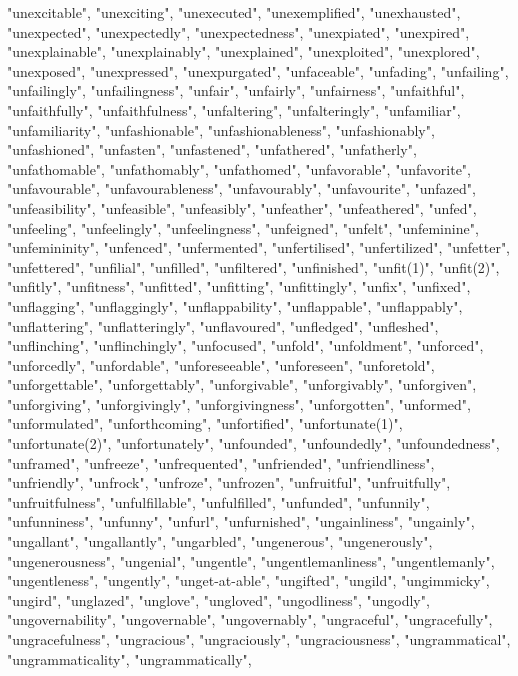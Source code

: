 "unexcitable",
"unexciting",
"unexecuted",
"unexemplified",
"unexhausted",
"unexpected",
"unexpectedly",
"unexpectedness",
"unexpiated",
"unexpired",
"unexplainable",
"unexplainably",
"unexplained",
"unexploited",
"unexplored",
"unexposed",
"unexpressed",
"unexpurgated",
"unfaceable",
"unfading",
"unfailing",
"unfailingly",
"unfailingness",
"unfair",
"unfairly",
"unfairness",
"unfaithful",
"unfaithfully",
"unfaithfulness",
"unfaltering",
"unfalteringly",
"unfamiliar",
"unfamiliarity",
"unfashionable",
"unfashionableness",
"unfashionably",
"unfashioned",
"unfasten",
"unfastened",
"unfathered",
"unfatherly",
"unfathomable",
"unfathomably",
"unfathomed",
"unfavorable",
"unfavorite",
"unfavourable",
"unfavourableness",
"unfavourably",
"unfavourite",
"unfazed",
"unfeasibility",
"unfeasible",
"unfeasibly",
"unfeather",
"unfeathered",
"unfed",
"unfeeling",
"unfeelingly",
"unfeelingness",
"unfeigned",
"unfelt",
"unfeminine",
"unfemininity",
"unfenced",
"unfermented",
"unfertilised",
"unfertilized",
"unfetter",
"unfettered",
"unfilial",
"unfilled",
"unfiltered",
"unfinished",
"unfit(1)",
"unfit(2)",
"unfitly",
"unfitness",
"unfitted",
"unfitting",
"unfittingly",
"unfix",
"unfixed",
"unflagging",
"unflaggingly",
"unflappability",
"unflappable",
"unflappably",
"unflattering",
"unflatteringly",
"unflavoured",
"unfledged",
"unfleshed",
"unflinching",
"unflinchingly",
"unfocused",
"unfold",
"unfoldment",
"unforced",
"unforcedly",
"unfordable",
"unforeseeable",
"unforeseen",
"unforetold",
"unforgettable",
"unforgettably",
"unforgivable",
"unforgivably",
"unforgiven",
"unforgiving",
"unforgivingly",
"unforgivingness",
"unforgotten",
"unformed",
"unformulated",
"unforthcoming",
"unfortified",
"unfortunate(1)",
"unfortunate(2)",
"unfortunately",
"unfounded",
"unfoundedly",
"unfoundedness",
"unframed",
"unfreeze",
"unfrequented",
"unfriended",
"unfriendliness",
"unfriendly",
"unfrock",
"unfroze",
"unfrozen",
"unfruitful",
"unfruitfully",
"unfruitfulness",
"unfulfillable",
"unfulfilled",
"unfunded",
"unfunnily",
"unfunniness",
"unfunny",
"unfurl",
"unfurnished",
"ungainliness",
"ungainly",
"ungallant",
"ungallantly",
"ungarbled",
"ungenerous",
"ungenerously",
"ungenerousness",
"ungenial",
"ungentle",
"ungentlemanliness",
"ungentlemanly",
"ungentleness",
"ungently",
"unget-at-able",
"ungifted",
"ungild",
"ungimmicky",
"ungird",
"unglazed",
"unglove",
"ungloved",
"ungodliness",
"ungodly",
"ungovernability",
"ungovernable",
"ungovernably",
"ungraceful",
"ungracefully",
"ungracefulness",
"ungracious",
"ungraciously",
"ungraciousness",
"ungrammatical",
"ungrammaticality",
"ungrammatically",
